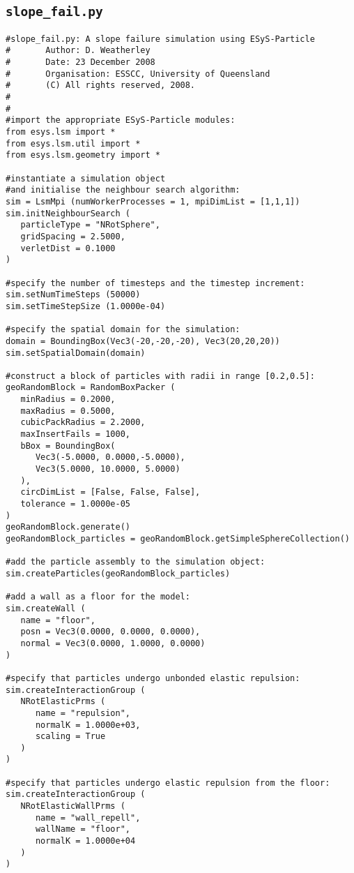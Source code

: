 \subsection{\texttt{slope\_fail.py}}\label{code:slope_fail}
\begin{verbatim}
#slope_fail.py: A slope failure simulation using ESyS-Particle
#       Author: D. Weatherley
#       Date: 23 December 2008
#       Organisation: ESSCC, University of Queensland
#       (C) All rights reserved, 2008.
#
#
#import the appropriate ESyS-Particle modules:
from esys.lsm import *
from esys.lsm.util import *
from esys.lsm.geometry import *

#instantiate a simulation object 
#and initialise the neighbour search algorithm:
sim = LsmMpi (numWorkerProcesses = 1, mpiDimList = [1,1,1])
sim.initNeighbourSearch (
   particleType = "NRotSphere",
   gridSpacing = 2.5000,
   verletDist = 0.1000
)

#specify the number of timesteps and the timestep increment:
sim.setNumTimeSteps (50000)
sim.setTimeStepSize (1.0000e-04)

#specify the spatial domain for the simulation:
domain = BoundingBox(Vec3(-20,-20,-20), Vec3(20,20,20))
sim.setSpatialDomain(domain)

#construct a block of particles with radii in range [0.2,0.5]:
geoRandomBlock = RandomBoxPacker (
   minRadius = 0.2000,
   maxRadius = 0.5000,
   cubicPackRadius = 2.2000,
   maxInsertFails = 1000,
   bBox = BoundingBox(
      Vec3(-5.0000, 0.0000,-5.0000),
      Vec3(5.0000, 10.0000, 5.0000)
   ),
   circDimList = [False, False, False],
   tolerance = 1.0000e-05
)
geoRandomBlock.generate()
geoRandomBlock_particles = geoRandomBlock.getSimpleSphereCollection()

#add the particle assembly to the simulation object:
sim.createParticles(geoRandomBlock_particles)

#add a wall as a floor for the model:
sim.createWall (
   name = "floor",
   posn = Vec3(0.0000, 0.0000, 0.0000),
   normal = Vec3(0.0000, 1.0000, 0.0000)
)

#specify that particles undergo unbonded elastic repulsion:
sim.createInteractionGroup (
   NRotElasticPrms (
      name = "repulsion",
      normalK = 1.0000e+03,
      scaling = True
   )
)

#specify that particles undergo elastic repulsion from the floor:
sim.createInteractionGroup (
   NRotElasticWallPrms (
      name = "wall_repell",
      wallName = "floor",
      normalK = 1.0000e+04
   )
)


\end{verbatim}
